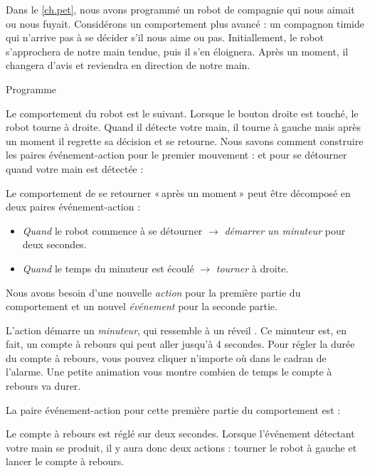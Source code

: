 
Dans le \cref{ch.pet}, nous avons programmé un robot de compagnie qui nous aimait ou nous fuyait.
Considérons un comportement plus avancé : un compagnon timide qui n'arrive pas à se décider s'il nous aime ou pas.
Initiallement, le robot s'approchera de notre main tendue, puis il s'en éloignera.
Après un moment, il changera d'avis et reviendra en direction de notre main.

{\raggedleft \hfill Programme }

Le comportement du robot est le suivant.
Lorsque le bouton droite est touché, le robot tourne à droite.
Quand il détecte votre main, il tourne à gauche mais après un moment il regrette sa décision et se retourne.
Nous savons comment construire les paires événement-action pour le premier mouvement :
 et pour se détourner quand votre main est détectée : 

Le comportement de se retourner «\,après un moment\,» peut être décomposé en deux paires événement-action :
\begin{itemize}

\item \emph{Quand} le robot commence à se détourner $\rightarrow$ \emph{démarrer un minuteur} pour deux secondes.

\item \emph{Quand} le temps du minuteur est écoulé $\rightarrow$ \emph{tourner} à droite.

\end{itemize}

Nous avons besoin d'une nouvelle \emph{action} pour la première partie du comportement et un nouvel \emph{événement} pour la seconde partie.

L'action démarre un \emph{minuteur}, qui ressemble à un réveil .
Ce minuteur est, en fait, un compte à rebours qui peut aller jusqu'à 4 secondes.
Pour régler la durée du compte à rebours, vous pouvez cliquer n'importe où dans le cadran de l'alarme.
Une petite animation vous montre combien de temps le compte à rebours va durer.

\newpage

La paire événement-action pour cette première partie du comportement est : 

Le compte à rebours est réglé sur deux secondes.
Lorsque l'événement détectant votre main se produit, il y aura donc deux actions : tourner le robot à gauche et lancer le compte à rebours.

